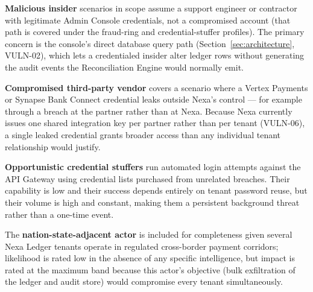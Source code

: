 \textbf{Malicious insider} scenarios in scope assume a support engineer or contractor with legitimate Admin Console credentials, not a compromised account (that path is covered under the fraud-ring and credential-stuffer profiles). The primary concern is the console's direct database query path (Section~\ref{sec:architecture}, VULN-02), which lets a credentialed insider alter ledger rows without generating the audit events the Reconciliation Engine would normally emit.

\textbf{Compromised third-party vendor} covers a scenario where a Vertex Payments or Synapse Bank Connect credential leaks outside Nexa's control --- for example through a breach at the partner rather than at Nexa. Because Nexa currently issues one shared integration key per partner rather than per tenant (VULN-06), a single leaked credential grants broader access than any individual tenant relationship would justify.

\textbf{Opportunistic credential stuffers} run automated login attempts against the API Gateway using credential lists purchased from unrelated breaches. Their capability is low and their success depends entirely on tenant password reuse, but their volume is high and constant, making them a persistent background threat rather than a one-time event.

The \textbf{nation-state-adjacent actor} is included for completeness given several Nexa Ledger tenants operate in regulated cross-border payment corridors; likelihood is rated low in the absence of any specific intelligence, but impact is rated at the maximum band because this actor's objective (bulk exfiltration of the ledger and audit store) would compromise every tenant simultaneously.
